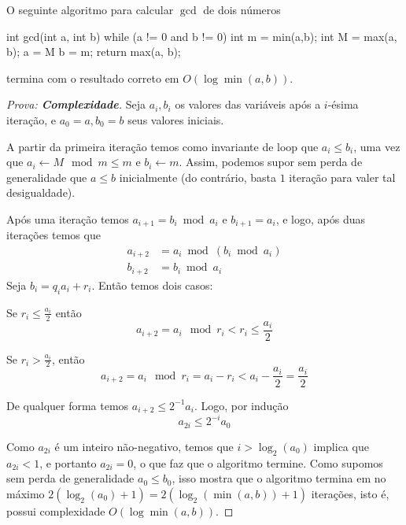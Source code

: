 \documentclass{article}
\begin{document}
\begin{theorem}\label{gcd-algorithm-efficiency}
    O seguinte algoritmo para calcular \(\gcd\) de dois números
    
    \begin{code}[C++]
        int gcd(int a, int b){
            while (a != 0 and b != 0){
                int m = min(a,b);
                int M = max(a, b);
                a = M %
                b = m;
            }
        return max(a, b);
        }        
    \end{code}

    termina com o resultado correto em \(O(\log \min(a, b))\).
\end{theorem}
\begin{proof}[Prova: \textbf{Complexidade}]
    Seja \(a_i, b_i\) os valores das variáveis após a 
    \(i\)-ésima iteração, e \(a_0 = a, b_0 = b\) seus valores iniciais.

    A partir da primeira iteração temos como invariante de loop
    que \(a_i \leq b_i\), uma vez que \(a_i \gets M \mod m \leq m\) e \(b_i \gets m\). Assim, podemos supor sem perda de generalidade que \(a \leq b\) inicialmente (do contrário, basta \(1\) iteração para valer tal desigualdade).
    
    Após uma iteração temos \(a_{i+1} = b_i \bmod a_i\) e \(b_{i+1} = a_i\), e logo, após duas iterações temos que
    \begin{align}
        a_{i+2} &= a_i \bmod (b_i \bmod a_i) \\
        b_{i+2} &= b_i \bmod a_i
    \end{align}
    Seja \(b_i = q_ia_i + r_i\). Então temos dois casos:
    \begin{case}[1]
        Se \(r_i \leq \frac{a_i}{2}\) então 
        \[a_{i+2} = a_i \mod r_i < r_i \leq \frac{a_i}{2}\]
    \end{case}
    \begin{case}[2]
        Se \(r_i > \frac{a_i}{2}\), então 
        \[a_{i+2} = a_i \mod r_i = a_i - r_i < a_i - \frac{a_i}{2} = \frac{a_i}{2}\]        
    \end{case}
    De qualquer forma temos \(a_{i+2} \leq 2^{-1}a_i\). Logo, por indução
    \[a_{2i} \leq 2^{-i}a_0\]

    Como \(a_{2i}\) é um inteiro não-negativo, temos que \(i > \log_2(a_0)\) implica que \(a_{2i} < 1\), e portanto \(a_{2i} = 0\), o que faz que o algoritmo termine. Como supomos sem perda de generalidade \(a_0  \leq b_0\), isso mostra que o algoritmo termina em no máximo \(2(\log_2(a_0) + 1) = 2(\log_2(\min(a, b)) + 1)\) iterações, isto é, possui complexidade \(O(\log \min(a, b))\). 
\end{proof}
\end{document}
